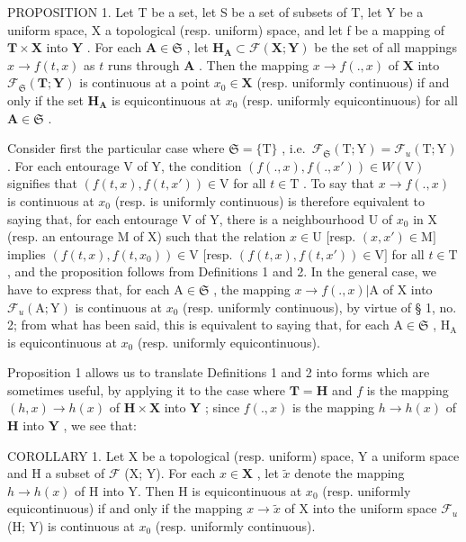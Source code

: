 PROPOSITION 1. Let T be a set, let S be a set of subsets of T, let Y be a uniform space, X a topological (resp. uniform) space, and let f be a mapping of \(\mathbf{T} \times \mathbf{X}\) into \(\mathbf{Y}\) . For each \(\mathbf{A} \in \mathfrak{S}\) , let \(\mathbf{H}_{\mathbf{A}} \subset \mathcal{F}(\mathbf{X}; \mathbf{Y})\) be the set of all mappings \(x \to f(t, x)\) as \(t\) runs through \(\mathbf{A}\) . Then the mapping \(x \to f(., x)\) of \(\mathbf{X}\) into \(\mathcal{F}_{\mathfrak{S}}(\mathbf{T}; \mathbf{Y})\) is continuous at a point \(x_0 \in \mathbf{X}\) (resp. uniformly continuous) if and only if the set \(\mathbf{H}_{\mathbf{A}}\) is equicontinuous at \(x_0\) (resp. uniformly equicontinuous) for all \(\mathbf{A} \in \mathfrak{S}\) .

Consider first the particular case where \(\mathfrak{S} = \{\mathrm{T}\}\) , i.e.~\(\mathcal{F}_{\mathfrak{S}}(\mathrm{T};\mathrm{Y}) = \mathcal{F}_u(\mathrm{T};\mathrm{Y})\) . For each entourage V of Y, the condition \((f(.,x),f(.,x'))\in W(\mathrm{V})\) signifies that \((f(t,x),f(t,x'))\in \mathrm{V}\) for all \(t\in \mathrm{T}\) . To say that \(x\to f(.,x)\) is continuous at \(x_0\) (resp. is uniformly continuous) is therefore equivalent to saying that, for each entourage V of Y, there is a neighbourhood U of \(x_0\) in X (resp. an entourage M of X) such that the relation \(x\in \mathrm{U}\) {[}resp. \((x,x')\in \mathrm{M}]\) implies \((f(t,x),f(t,x_0))\in \mathrm{V}\) {[}resp. \((f(t,x),f(t,x'))\in \mathrm{V}]\) for all \(t\in \mathrm{T}\) , and the proposition follows from Definitions 1 and 2. In the general case, we have to express that, for each \(\mathrm{A}\in \mathfrak{S}\) , the mapping \(x\rightarrow f(.,x)|\mathrm{A}\) of X into \(\mathcal{F}_u(\mathrm{A};\mathrm{Y})\) is continuous at \(x_0\) (resp. uniformly continuous), by virtue of § 1, no. 2; from what has been said, this is equivalent to saying that, for each \(\mathrm{A}\in \mathfrak{S}\) , \(\mathrm{H}_{\mathrm{A}}\) is equicontinuous at \(x_0\) (resp. uniformly equicontinuous).

Proposition 1 allows us to translate Definitions 1 and 2 into forms which are sometimes useful, by applying it to the case where \(\mathbf{T} = \mathbf{H}\) and \(f\) is the mapping \((h, x) \to h(x)\) of \(\mathbf{H} \times \mathbf{X}\) into \(\mathbf{Y}\) ; since \(f(., x)\) is the mapping \(h \to h(x)\) of \(\mathbf{H}\) into \(\mathbf{Y}\) , we see that:

COROLLARY 1. Let X be a topological (resp. uniform) space, Y a uniform space and H a subset of \(\mathcal{F}\) (X; Y). For each \(x \in \mathbf{X}\) , let \(\tilde{x}\) denote the mapping \(h \to h(x)\) of H into Y. Then H is equicontinuous at \(x_0\) (resp. uniformly equicontinuous) if and only if the mapping \(x \to \tilde{x}\) of X into the uniform space \(\mathcal{F}_u\) (H; Y) is continuous at \(x_0\) (resp. uniformly continuous).

